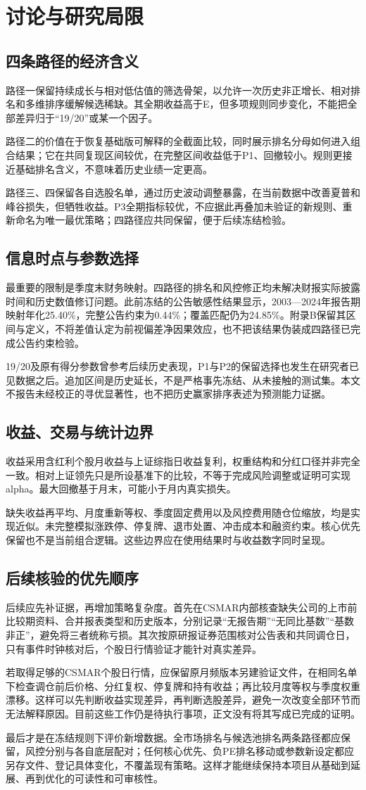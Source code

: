 
\chapter{讨论与研究局限}
\section{四条路径的经济含义}
路径一保留持续成长与相对低估值的筛选骨架，以允许一次历史非正增长、相对排名和多维排序缓解候选稀缺。其全期收益高于E，但多项规则同步变化，不能把全部差异归于“19/20”或某一个因子。

路径二的价值在于恢复基础版可解释的全截面比较，同时展示排名分母如何进入组合结果；它在共同复现区间较优，在完整区间收益低于P1、回撤较小。规则更接近基础排名含义，不意味着历史业绩一定更高。

路径三、四保留各自选股名单，通过历史波动调整暴露，在当前数据中改善夏普和峰谷损失，但牺牲收益。P3全期指标较优，不应据此再叠加未验证的新规则、重新命名为唯一最优策略；四路径应共同保留，便于后续冻结检验。

\section{信息时点与参数选择}
最重要的限制是季度末财务映射。四路径的排名和风控修正均未解决财报实际披露时间和历史数值修订问题。此前冻结的公告敏感性结果显示，2003—2024年报告期映射年化25.40\%，完整公告约束为0.44\%；覆盖匹配仍为24.85\%。附录B保留其区间与定义，不将差值认定为前视偏差净因果效应，也不把该结果伪装成四路径已完成公告约束检验。

19/20及原有得分参数曾参考后续历史表现，P1与P2的保留选择也发生在研究者已见数据之后。追加区间是历史延长，不是严格事先冻结、从未接触的测试集。本文不报告未经校正的寻优显著性，也不把历史赢家排序表述为预测能力证据。

\section{收益、交易与统计边界}
收益采用含红利个股月收益与上证综指日收益复利，权重结构和分红口径并非完全一致。相对上证领先只是所设基准下的比较，不等于完成风险调整或证明可实现alpha。最大回撤基于月末，可能小于月内真实损失。

缺失收益再平均、月度重新等权、季度固定费用以及风控费用随仓位缩放，均是实现近似。未完整模拟涨跌停、停复牌、退市处置、冲击成本和融资约束。核心优先保留也不是当前组合逻辑。这些边界应在使用结果时与收益数字同时呈现。

\section{后续核验的优先顺序}
后续应先补证据，再增加策略复杂度。首先在CSMAR内部核查缺失公司的上市前比较期资料、合并报表类型和历史版本，分别记录“无报告期”“无同比基数”“基数非正”，避免将三者统称亏损。其次按原研报证券范围核对公告表和共同调仓日，只有事件时钟核对后，个股日行情验证才能针对真实差异。

若取得足够的CSMAR个股日行情，应保留原月频版本另建验证文件，在相同名单下检查调仓前后价格、分红复权、停复牌和持有收益；再比较月度等权与季度权重漂移。这样可以先判断收益实现差异，再判断选股差异，避免一次改变全部环节而无法解释原因。目前这些工作仍是待执行事项，正文没有将其写成已完成的证明。

最后才是在冻结规则下评价新增数据。全市场排名与候选池排名两条路径都应保留，风控分别与各自底层配对；任何核心优先、负PE排名移动或参数新设定都应另存文件、登记具体变化，不覆盖现有策略。这样才能继续保持本项目从基础到延展、再到优化的可读性和可审核性。
